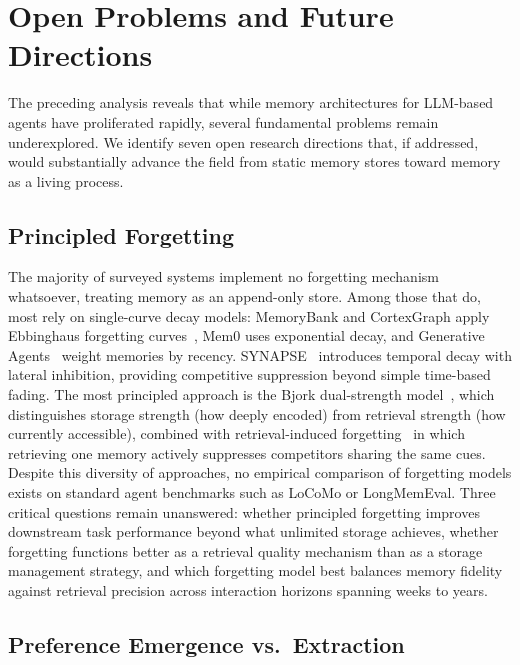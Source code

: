 \section{Open Problems and Future Directions}
\label{sec:open-problems}

The preceding analysis reveals that while memory architectures for
LLM-based agents have proliferated rapidly, several fundamental
problems remain underexplored. We identify seven open research
directions that, if addressed, would substantially advance the field
from static memory stores toward memory as a living process.

\subsection{Principled Forgetting}

The majority of surveyed systems implement no forgetting mechanism
whatsoever, treating memory as an append-only store. Among those that
do, most rely on single-curve decay models: MemoryBank and
CortexGraph apply Ebbinghaus forgetting
curves~\cite{ebbinghaus1885}, Mem0 uses exponential decay, and
Generative Agents~\cite{park2023generative} weight memories by
recency. SYNAPSE~\cite{jiang2026synapse} introduces temporal decay
with lateral inhibition, providing competitive suppression beyond
simple time-based fading. The most principled approach is the Bjork
dual-strength model~\cite{bjork1992}, which distinguishes storage
strength (how deeply encoded) from retrieval strength (how currently
accessible), combined with retrieval-induced
forgetting~\cite{anderson1994} in which retrieving one memory actively
suppresses competitors sharing the same cues. Despite this diversity
of approaches, no empirical
comparison of forgetting models exists on standard agent benchmarks
such as LoCoMo or LongMemEval. Three critical questions remain
unanswered: whether principled forgetting improves downstream task
performance beyond what unlimited storage achieves, whether forgetting
functions better as a retrieval quality mechanism than as a storage
management strategy, and which forgetting model best balances memory
fidelity against retrieval precision across interaction horizons
spanning weeks to years.

\subsection{Preference Emergence vs.\ Extraction}

